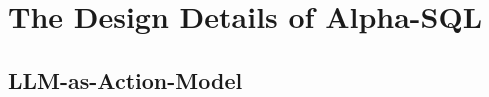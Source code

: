 \section{The Design Details of Alpha-SQL}
\label{sec:method}










\subsection{LLM-as-Action-Model}
\label{sub:llmaction}



